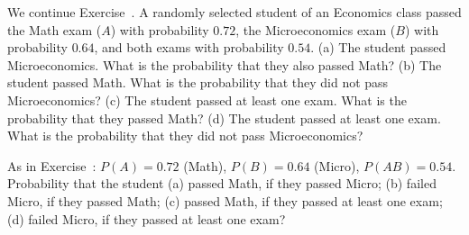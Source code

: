 
\begin{problem}
	We continue Exercise~. A randomly selected student of an
	Economics class passed the Math exam ($A$) with probability $0.72$, the
	Microeconomics exam ($B$) with probability $0.64$, and both exams with
	probability $0.54$.
	(a) The student passed Microeconomics. What is the probability that they
	also passed Math?
	(b) The student passed Math. What is the probability that they did not
	pass Microeconomics?
	(c) The student passed at least one exam. What is the probability that they
	passed Math?
	(d) The student passed at least one exam. What is the probability that they
	did not pass Microeconomics?
\end{problem}

\begin{slideproblem}
	As in Exercise~: $P(A)=0.72$ (Math), $P(B)=0.64$
	(Micro), $P(AB)=0.54$. Probability that the student (a) passed Math, if
	they passed Micro; (b) failed Micro, if they passed Math; (c) passed Math,
	if they passed at least one exam; (d) failed Micro, if they passed at least
	one exam?
\end{slideproblem}

